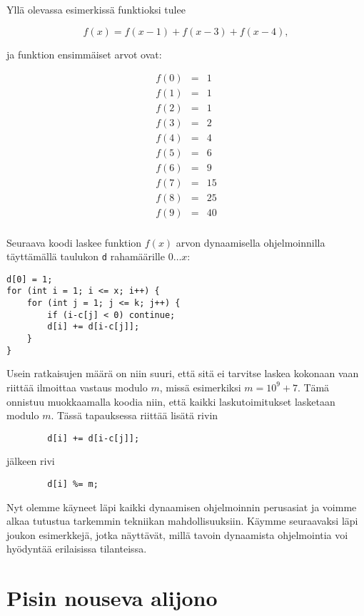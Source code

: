 Yllä olevassa esimerkissä funktioksi tulee

\[ f(x) = f(x-1)+f(x-3)+f(x-4), \]

ja funktion ensimmäiset arvot ovat:

\[
\begin{array}{lcl}
f(0) & = & 1 \\
f(1) & = & 1 \\
f(2) & = & 1 \\
f(3) & = & 2 \\
f(4) & = & 4 \\
f(5) & = & 6 \\
f(6) & = & 9 \\
f(7) & = & 15 \\
f(8) & = & 25 \\
f(9) & = & 40 \\
\end{array}
\]

Seuraava koodi laskee funktion $f(x)$ arvon
dynaamisella ohjelmoinnilla täyttämällä taulukon
\texttt{d} rahamäärille $0 \ldots x$:

\begin{lstlisting}
d[0] = 1;
for (int i = 1; i <= x; i++) {
    for (int j = 1; j <= k; j++) {
        if (i-c[j] < 0) continue;
        d[i] += d[i-c[j]];
    }
}
\end{lstlisting}

Usein ratkaisujen määrä on niin suuri, että sitä ei tarvitse
laskea kokonaan vaan riittää ilmoittaa vastaus
modulo $m$, missä esimerkiksi $m=10^9+7$.
Tämä onnistuu muokkaamalla koodia niin,
että kaikki laskutoimitukset lasketaan modulo $m$.
Tässä tapauksessa riittää lisätä rivin
\begin{lstlisting}
        d[i] += d[i-c[j]];
\end{lstlisting}
jälkeen rivi
\begin{lstlisting}
        d[i] %= m;
\end{lstlisting}

Nyt olemme käyneet läpi kaikki dynaamisen ohjelmoinnin
perusasiat ja voimme alkaa tutustua
tarkemmin tekniikan mahdollisuuksiin.
Käymme seuraavaksi läpi joukon esimerkkejä,
jotka näyttävät, millä tavoin dynaamista ohjelmointia
voi hyödyntää erilaisissa tilanteissa.

\section{Pisin nouseva alijono}


